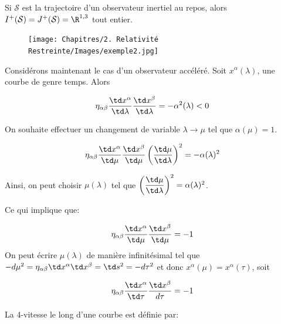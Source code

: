     \begin{exmp}
    Si $\mathcal{S}$ est la trajectoire d'un observateur inertiel au repos, alors $I^{+}(\mathcal{S}) = J^{+}(\mathcal{S}) = \R^{1,3}$ tout entier.
    \begin{figure}[H]
        \centering
        \texttt{[image: Chapitres/2. Relativité Restreinte/Images/exemple2.jpg]}
        \caption{}
        \label{fig:2.7}
    \end{figure}
\end{exmp}
\begin{exmp}
    Considérons maintenant le cas d'un observateur accéléré. Soit $x^{\alpha}(\lambda)$, une courbe de genre temps. Alors
    
    \begin{equation}
    \eta_{\alpha \beta} \frac{\td x^{\alpha}}{\td \lambda}\frac{\td x^{\beta}}{\td \lambda} = -\alpha^2(\lambda) < 0
    \end{equation}

    On souhaite effectuer un changement de variable $\lambda \to \mu$ tel que $\alpha(\mu) = 1$.

    \begin{equation*}
        \eta_{\alpha \beta} \frac{\td x^{\alpha}}{\td \mu}\frac{\td x^{\beta}}{\td \mu} \left(\frac{\td \mu}{\td \lambda}\right)^2 = -\alpha(\lambda)^2
    \end{equation*}

    Ainsi, on peut choisir $ \mu (\lambda )$ tel que $\left(\dfrac{\td \mu}{\td \lambda}\right)^2 = \alpha(\lambda)^2$.

    Ce qui implique que: 

    \begin{equation*}
         \eta_{\alpha \beta} \frac{\td x^{\alpha}}{\td \mu}\frac{\td x^{\beta}}{\td \mu} = -1
    \end{equation*}
    On peut écrire $\mu (\lambda )$ de manière infinitésimal tel que $-d\mu ^2 = \eta_{\alpha \beta} \td x^{\alpha} \td x^{\beta} = \td s^2 = -d\tau^2$ et donc $x^{\alpha}(\mu) = x^{\alpha}(\tau)$, soit

    \begin{equation*}
        \eta_{\alpha \beta} \frac{\td x^{\alpha}}{\td \tau}\frac{\td x^{\beta}}{d \tau} = -1
    \end{equation*}

    La 4-vitesse le long d'une courbe est définie par:


\end{exmp}
